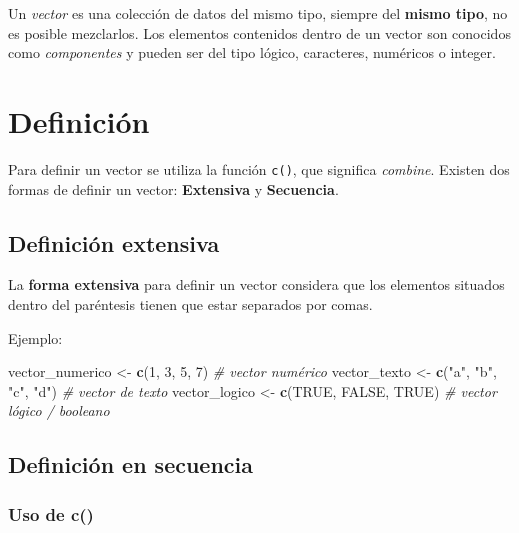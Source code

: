 \documentclass[
]{book}
\newenvironment{Shaded}{\begin{snugshade}}{\end{snugshade}}
\newcommand{\CommentTok}[1]{\textcolor[rgb]{0.56,0.35,0.01}{\textit{#1}}}
\newcommand{\ConstantTok}[1]{\textcolor[rgb]{0.56,0.35,0.01}{#1}}
\newcommand{\DecValTok}[1]{\textcolor[rgb]{0.00,0.00,0.81}{#1}}
\newcommand{\FunctionTok}[1]{\textcolor[rgb]{0.13,0.29,0.53}{\textbf{#1}}}
\newcommand{\NormalTok}[1]{#1}
\newcommand{\OtherTok}[1]{\textcolor[rgb]{0.56,0.35,0.01}{#1}}
\newcommand{\StringTok}[1]{\textcolor[rgb]{0.31,0.60,0.02}{#1}}
\begin{document}
Un \emph{vector} es una colección de datos del mismo tipo, siempre del \textbf{mismo tipo}, no es posible mezclarlos. Los elementos contenidos dentro de un vector son conocidos como \emph{componentes} y pueden ser del tipo lógico, caracteres, numéricos o integer.

\section{Definición}\label{definiciuxf3n}

Para definir un vector se utiliza la función \texttt{c()}, que significa \emph{combine}.
Existen dos formas de definir un vector: \textbf{Extensiva} y \textbf{Secuencia}.

\subsection{Definición extensiva}\label{definiciuxf3n-extensiva}

La \textbf{forma extensiva} para definir un vector considera que los elementos situados dentro del paréntesis tienen que estar separados por comas.

Ejemplo:

\begin{Shaded}
\begin{Highlighting}[]
\NormalTok{vector\_numerico }\OtherTok{\textless{}{-}} \FunctionTok{c}\NormalTok{(}\DecValTok{1}\NormalTok{, }\DecValTok{3}\NormalTok{, }\DecValTok{5}\NormalTok{, }\DecValTok{7}\NormalTok{)      }\CommentTok{\# vector numérico}
\NormalTok{vector\_texto }\OtherTok{\textless{}{-}} \FunctionTok{c}\NormalTok{(}\StringTok{"a"}\NormalTok{, }\StringTok{"b"}\NormalTok{, }\StringTok{"c"}\NormalTok{, }\StringTok{"d"}\NormalTok{) }\CommentTok{\# vector de texto}
\NormalTok{vector\_logico }\OtherTok{\textless{}{-}} \FunctionTok{c}\NormalTok{(}\ConstantTok{TRUE}\NormalTok{, }\ConstantTok{FALSE}\NormalTok{, }\ConstantTok{TRUE}\NormalTok{) }\CommentTok{\# vector lógico / booleano}
\end{Highlighting}
\end{Shaded}

\subsection{Definición en secuencia}\label{definiciuxf3n-en-secuencia}

\subsubsection{Uso de c()}\label{uso-de-c}
\end{document}
